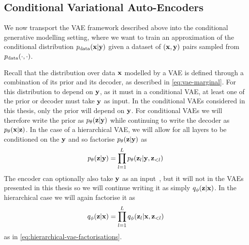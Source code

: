 \subsection{Conditional Variational Auto-Encoders}
\label{sec:conditional-vae}
We now transport the VAE framework described above into the conditional generative modelling setting, where we want to train an approximation of the conditional distribution $p_{\rm{data}}({\mathbf{x}}|{\mathbf{y}})$ given a dataset of $({\mathbf{x}}, {\mathbf{y}})$ pairs sampled from $p_{\rm{data}}(\cdot,\cdot)$.

Recall that the distribution over data ${\mathbf{x}}$ modelled by a VAE is defined through a combination of its prior and its decoder, as described in \cref{eq:vae-marginal}. For this distribution to depend on ${\mathbf{y}}$, as it must in a conditional VAE, at least one of the prior or decoder must take ${\mathbf{y}}$ as input. In the conditional VAEs considered in this thesis, only the prior will depend on ${\mathbf{y}}$. For conditional VAEs we will therefore write the prior as $p_\theta({\mathbf{z}}|{\mathbf{y}})$ while continuing to write the decoder as $p_\theta({\mathbf{x}}|{\mathbf{z}})$. In the case of a hierarchical VAE, we will allow for all layers to be conditioned on the ${\mathbf{y}}$ and so factorise $p_\theta({\mathbf{z}}|{\mathbf{y}})$ as
\begin{equation}
    p_\theta({\mathbf{z}}|{\mathbf{y}}) = \prod_{l=1}^L p_\theta({\mathbf{z}}_l|{\mathbf{y}},{\mathbf{z}}_{<l})
\end{equation}
The encoder can optionally also take ${\mathbf{y}}$ as an input~\citep{sohn2015learning}, but it will not in the VAEs presented in this thesis so we will continue writing it as simply $q_\phi({\mathbf{z}}|{\mathbf{x}})$. In the hierarchical case we will again factorise it as
\begin{equation} \label{eq:conditional-hierarchical-vae-factorisations}
    q_\phi({\mathbf{z}}|{\mathbf{x}}) = \prod_{l=1}^L q_\phi({\mathbf{z}}_l|{\mathbf{x}},{\mathbf{z}}_{<l})
\end{equation}
as in \cref{eq:hierarchical-vae-factorisations}.

